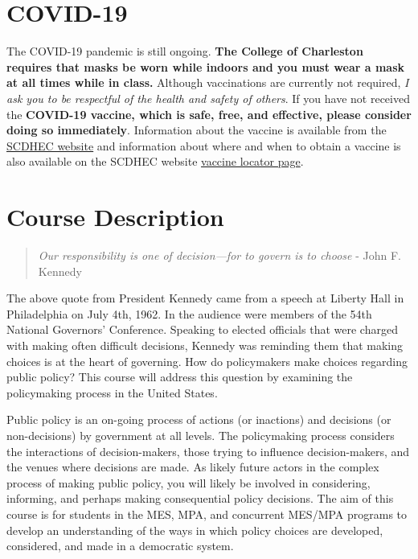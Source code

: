 \hypertarget{covid-19}{%
\section{COVID-19}\label{covid-19}}

The COVID-19 pandemic is still ongoing. \textbf{The College of
Charleston requires that masks be worn while indoors and you must wear a
mask at all times while in class.} Although vaccinations are currently
not required, \emph{I ask you to be respectful of the health and safety
of others}. If you have not received the \textbf{COVID-19 vaccine, which
is safe, free, and effective, please consider doing so immediately}.
Information about the vaccine is available from the
\href{https://scdhec.gov/covid19/covid-19-vaccine}{SCDHEC website} and
information about where and when to obtain a vaccine is also available
on the SCDHEC website \href{https://vaxlocator.dhec.sc.gov/}{vaccine
locator page}.

\hypertarget{course-description}{%
\section{Course Description}\label{course-description}}

\begin{quote}
\emph{Our responsibility is one of decision---for to govern is to
choose} - John F. Kennedy
\end{quote}

\vspace{0.1in}

\noindent The above quote from President Kennedy came from a speech at
Liberty Hall in Philadelphia on July 4th, 1962. In the audience were
members of the 54th National Governors' Conference. Speaking to elected
officials that were charged with making often difficult decisions,
Kennedy was reminding them that making choices is at the heart of
governing. How do policymakers make choices regarding public policy?
This course will address this question by examining the policymaking
process in the United States.

\vspace{0.1in}

\noindent Public policy is an on-going process of actions (or inactions)
and decisions (or non-decisions) by government at all levels. The
policymaking process considers the interactions of decision-makers,
those trying to influence decision-makers, and the venues where
decisions are made. As likely future actors in the complex process of
making public policy, you will likely be involved in considering,
informing, and perhaps making consequential policy decisions. The aim of
this course is for students in the MES, MPA, and concurrent MES/MPA
programs to develop an understanding of the ways in which policy choices
are developed, considered, and made in a democratic system.

